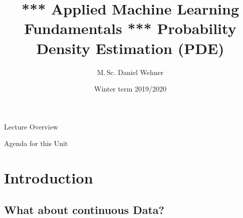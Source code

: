 


\title[Probability Density Estimation]{*** Applied Machine Learning Fundamentals *** Probability Density Estimation (PDE)}
\author{M.\,Sc. Daniel Wehner}
\date{Winter term 2019/2020}




\maketitlepage


\begin{frame}{Lecture Overview}{}
\end{frame}


\begin{frame}{Agenda for this Unit}
	\begin{multicols}{2}
		\tableofcontents
	\end{multicols}
\end{frame}


\section{Introduction}

\subsection{What about continuous Data?}

